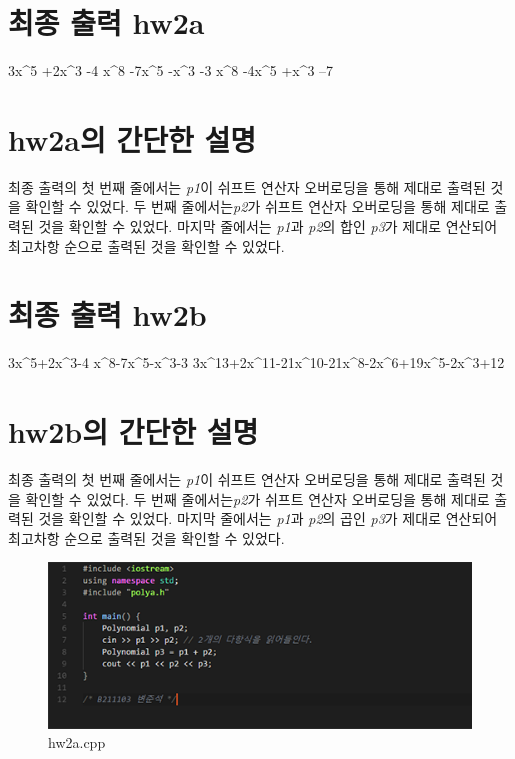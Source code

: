 \documentclass[a4paper,12pt]{article}
\begin{document}
\section{최종 출력 hw2a}
3x\^{}5 +2x\^{}3 -4
\newline
x\^{}8 -7x\^{}5 -x\^{}3 -3
\newline
x\^{}8 -4x\^{}5 +x\^{}3 –7

\section{hw2a의 간단한 설명}
최종 출력의 첫 번째 줄에서는 \textsl{p1}이 쉬프트 연산자 오버로딩을 통해 제대로 출력된 것을 확인할 수 있었다.
두 번째 줄에서는\textsl{p2}가 쉬프트 연산자 오버로딩을 통해 제대로 출력된 것을 확인할 수 있었다.
마지막 줄에서는 \textsl{p1}과 \textsl{p2}의 합인 \textsl{p3}가 제대로 연산되어 최고차항 순으로 출력된 것을 확인할 수 있었다.


\section{최종 출력 hw2b}
3x\^{}5+2x\^{}3-4
\newline
x\^{}8-7x\^{}5-x\^{}3-3
\newline
3x\^{}13+2x\^{}11-21x\^{}10-21x\^{}8-2x\^{}6+19x\^{}5-2x\^{}3+12

\section{hw2b의 간단한 설명}
최종 출력의 첫 번째 줄에서는 \textsl{p1}이 쉬프트 연산자 오버로딩을 통해 제대로 출력된 것을 확인할 수 있었다.
두 번째 줄에서는\textsl{p2}가 쉬프트 연산자 오버로딩을 통해 제대로 출력된 것을 확인할 수 있었다.
마지막 줄에서는 \textsl{p1}과 \textsl{p2}의 곱인 \textsl{p3}가 제대로 연산되어 최고차항 순으로 출력된 것을 확인할 수 있었다.


\newpage
\begin{figure}[t]\vspace*{4pt} 
\centerline{\includegraphics[width=1.0\columnwidth]{hw2a}} 
\caption{hw2a.cpp}\vspace*{-6pt} 
\label{figure:hw2a} 
\end{figure} 
\end{document}
